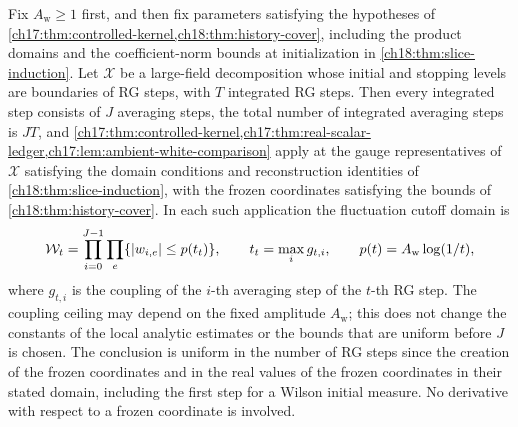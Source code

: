 \begin{lemma}\label{ch19:lem:covered-history-admission}
Fix $A_{\mathrm w}\ge1$ first, and then fix parameters satisfying the hypotheses of \cref{ch17:thm:controlled-kernel,ch18:thm:history-cover}, including the product domains and the coefficient-norm bounds at initialization in \cref{ch18:thm:slice-induction}. Let $\mathcal X$ be a large-field decomposition whose initial and stopping levels are boundaries of RG steps, with $T$ integrated RG steps. Then every integrated step consists of $J$ averaging steps, the total number of integrated averaging steps is $JT$, and \cref{ch17:thm:controlled-kernel,ch17:thm:real-scalar-ledger,ch17:lem:ambient-white-comparison} apply at the gauge representatives of $\mathcal X$ satisfying the domain conditions and reconstruction identities of \cref{ch18:thm:slice-induction}, with the frozen coordinates satisfying the bounds of \cref{ch18:thm:history-cover}. In each such application the fluctuation cutoff domain is
\begin{equation}\label{ch19:eq:implemented-history-product}
 \mathcal W_t=\prod_{i=0}^{J-1}\prod_e\{\lvert w_{i,e}\rvert\le p(t_t)\},\qquad
 t_t=\max_ig_{t,i},\qquad p(t)=A_{\mathrm w}\log(1/t),
\end{equation}
where $g_{t,i}$ is the coupling of the $i$-th averaging step of the $t$-th RG step. The coupling ceiling may depend on the fixed amplitude $A_{\mathrm w}$; this does not change the constants of the local analytic estimates or the bounds that are uniform before $J$ is chosen. The conclusion is uniform in the number of RG steps since the creation of the frozen coordinates and in the real values of the frozen coordinates in their stated domain, including the first step for a Wilson initial measure. No derivative with respect to a frozen coordinate is involved.
\end{lemma}

